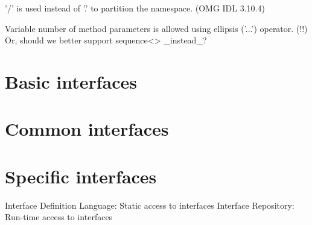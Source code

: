 \documentclass[onecolumn]{article}
\begin{document}
\par '/' is used instead of '.' to partition the namespace. (OMG IDL 3.10.4)

\par Variable number of method parameters is allowed using ellipsis ('...') operator.
(!!) Or, should we better support sequence<> _instead_?

\section{Basic interfaces}

\section{Common interfaces}

\section{Specific interfaces}

Interface Definition Language: Static access to interfaces
Interface Repository: Run-time access to interfaces

\small



\end{document}

